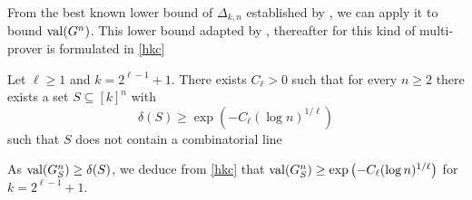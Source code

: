 From the best known lower bound of $\Delta_{k,n}$ established by \cite{polymath2010density}, we can apply it to bound $\mathrm{val} (G^n)$. This lower bound adapted by \cite{hkazla2016forbidden}, thereafter for this kind of multi-prover is formulated in \eqref{hkc}
 
 \begin{thm}Let $\ell \geq 1$ and $k=2^{\ell-1}+1.$ There exists $C_{\ell} >0$ such that for every $n\geq 2$ there exists a set $S \subseteq [k]^n$ with $$ \delta(S) \geq \exp \left( -C_{\ell} (\log n)^{1/\ell} \right)$$	 such that $S$ does not contain a combinatorial line  \label{hkc}	\end{thm}

 As $\mathrm{val} (G_S^n) \geq  \delta(S)$, we deduce from \eqref{hkc} that  $\mathrm{val} (G_S^n) \geq  \exp \left( -C_{\ell} (\log n)^{1/\ell} \right)$ for $k=2^{\ell-1}+1.$
 
 
 
 
 
 